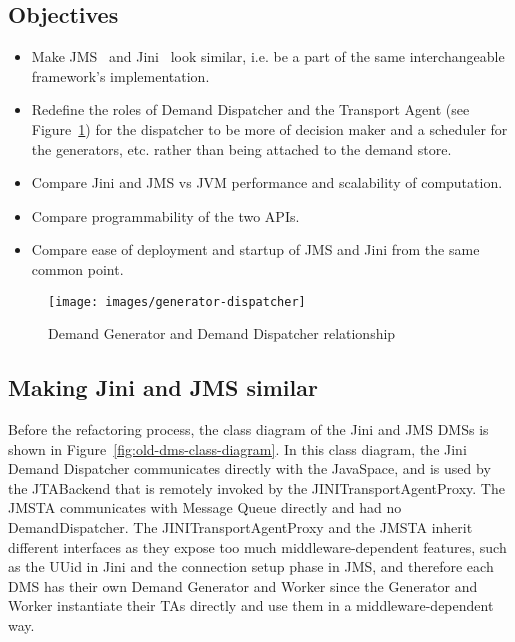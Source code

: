 \documentclass{easychair}
\newcommand{\xf}[1]{Figure~\ref{#1}}
\newcommand{\jini}{{Jini\index{Jini}}}
\newcommand{\jms}{{JMS\index{JMS}}}
\begin{document}
\subsection{Objectives}
\label{sect:objectives}


\begin{itemize}
	\item 
	Make {\jms}~\cite{jms} and {\jini}~\cite{jini} look similar, i.e. be a part of
	the same interchangeable framework's implementation.
	
	\item 
	Redefine the roles of Demand Dispatcher and the Transport Agent (see \xf{fig:generator-dispatcher})
	for the dispatcher to be more of decision maker and a scheduler for the generators, etc. rather than
	being attached to the demand store.
	
\item
	Compare Jini and JMS vs JVM performance and scalability of computation.
	
	\item
	Compare programmability of the two APIs.
	
	\item
	Compare ease of deployment and startup of JMS and Jini from the same common point.
\end{itemize}

\begin{figure}[htpb!]
	\centering
	\texttt{[image: images/generator-dispatcher]}
	\caption{Demand Generator and Demand Dispatcher relationship}
	\label{fig:generator-dispatcher}
\end{figure}

\subsection{Making {\jini} and {\jms} similar}

Before the refactoring process, the class diagram of the Jini and JMS DMSs
	is shown in \xf{fig:old-dms-class-diagram}. In this class diagram, the Jini 
	Demand Dispatcher communicates directly with the JavaSpace, and is used by
	the JTABackend that is remotely invoked by the JINITransportAgentProxy. 
	The JMSTA communicates with Message Queue directly and had no DemandDispatcher. 
	The JINITransportAgentProxy and the JMSTA inherit different interfaces as they
	expose too much middleware-dependent features, such as the UUid in {\jini} and the
	connection setup phase in {\jms}, and therefore each DMS has their own Demand 
	Generator and Worker since the Generator and Worker instantiate their TAs
	directly and use them in a middleware-dependent way.
	
\end{document}

